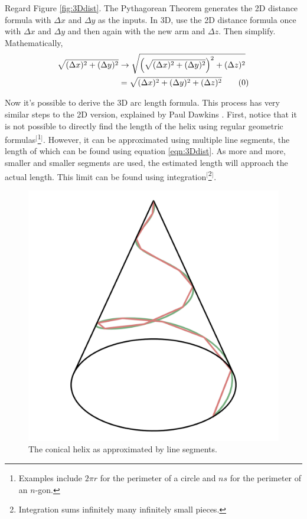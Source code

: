 \documentclass{article}
\begin{document}
Regard Figure \ref{fig:3Ddist}. The Pythagorean Theorem generates the 2D distance formula with $\Delta x$ and $\Delta y$ as the inputs. In 3D, use the 2D distance formula once with $\Delta x$ and $\Delta y$ and then again with the new arm and $\Delta z$. Then simplify. Mathematically,
\begin{align*}
    \sqrt{(\Delta x)^2+(\Delta y)^2} &\rightarrow \sqrt{\left(\sqrt{(\Delta x)^2+(\Delta y)^2}\right)^2+(\Delta z)^2}\\
    &= \sqrt{(\Delta x)^2+(\Delta y)^2+(\Delta z)^2}\tag{\theequation}\label{eqn:3Ddist}
    \stepcounter{equation}
\end{align*}\par
Now it's possible to derive the 3D arc length formula. This process has very similar steps to the 2D version, explained by Paul Dawkins \cite{Bib:2Darc}. First, notice that it is not possible to directly find the length of the helix using regular geometric formulas$^[$\footnote{Examples include $2\pi r$ for the perimeter of a circle and $ns$ for the perimeter of an $n$-gon.}$^]$. However, it can be approximated using multiple line segments, the length of which can be found using equation \ref{eqn:3Ddist}. As more and more, smaller and smaller segments are used, the estimated length will approach the actual length. This limit can be found using integration$^[$\footnote{Integration sums infinitely many infinitely small pieces.}$^]$.\par

\begin{figure}[h!]
    \centering
    \includegraphics[width=0.4\linewidth]{Blender/helixsegs.png}
    \caption{The conical helix as approximated by line segments.}
    \label{fig:helixsegs}
\end{figure}
\end{document}
